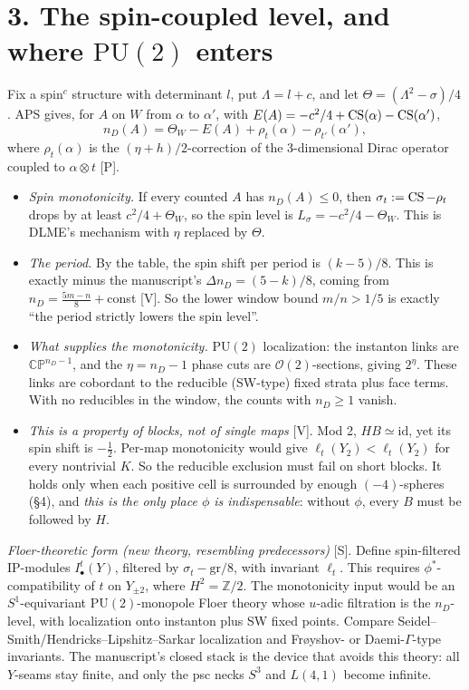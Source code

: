 \documentclass[10pt]{amsart}
\newcommand{\Z}{\mathbb Z}\newcommand{\Q}{\mathbb Q}\newcommand{\F}{\mathbb F}
\newcommand{\CP}{\mathbb{CP}}\newcommand{\CPb}{\overline{\mathbb{CP}}{}^2}
\newcommand{\V}{\textsf{[V]}}\newcommand{\Pl}{\textsf{[P]}}\newcommand{\Sp}{\textsf{[S]}}
\begin{document}
\section*{3. The spin-coupled level, and where $\mathrm{PU}(2)$ enters}
Fix a spin$^c$ structure with determinant $l$, put $\Lambda=l+c$, and let $\Theta=(\Lambda^2-\sigma)/4$. APS gives, for $A$ on $W$ from $\alpha$ to $\alpha'$, with $E(A)=-c^2/4+\operatorname{CS}(\alpha)-\operatorname{CS}(\alpha')$,
\[
n_D(A)=\Theta_W-E(A)+\rho_t(\alpha)-\rho_{t'}(\alpha'),
\]
where $\rho_t(\alpha)$ is the $(\eta+h)/2$-correction of the 3-dimensional Dirac operator coupled to $\alpha\otimes t$ \Pl.
\begin{itemize}
\item \emph{Spin monotonicity.} If every counted $A$ has $n_D(A)\le0$, then $\sigma_t:=\operatorname{CS}-\rho_t$ drops by at least $c^2/4+\Theta_W$, so the spin level is $L_\sigma=-c^2/4-\Theta_W$. This is DLME's mechanism with $\eta$ replaced by $\Theta$.
\item \emph{The period.} By the table, the spin shift per period is $(k-5)/8$. This is exactly minus the manuscript's $\Delta n_D=(5-k)/8$, coming from $n_D=\frac{5m-n}8+$const \V. So the lower window bound $m/n>1/5$ is exactly ``the period strictly lowers the spin level''.
\item \emph{What supplies the monotonicity.} $\mathrm{PU}(2)$ localization: the instanton links are $\CP^{n_D-1}$, and the $\eta=n_D-1$ phase cuts are $\mathcal O(2)$-sections, giving $2^\eta$. These links are cobordant to the reducible (SW-type) fixed strata plus face terms. With no reducibles in the window, the counts with $n_D\ge1$ vanish.
\item \emph{This is a property of blocks, not of single maps} \V. Mod 2, $HB\simeq\mathrm{id}$, yet its spin shift is $-\tfrac12$. Per-map monotonicity would give $\ell_t(Y_2)<\ell_t(Y_2)$ for every nontrivial $K$. So the reducible exclusion must fail on short blocks. It holds only when each positive cell is surrounded by enough $(-4)$-spheres (\S4), and \emph{this is the only place $\phi$ is indispensable}: without $\phi$, every $B$ must be followed by $H$.
\end{itemize}
\emph{Floer-theoretic form (new theory, resembling predecessors)} \Sp. Define spin-filtered IP-modules $I^{t}_\bullet(Y)$, filtered by $\sigma_t-\mathrm{gr}/8$, with invariant $\ell_t$. This requires $\phi^*$-compatibility of $t$ on $Y_{\pm2}$, where $H^2=\Z/2$. The monotonicity input would be an $S^1$-equivariant $\mathrm{PU}(2)$-monopole Floer theory whose $u$-adic filtration is the $n_D$-level, with localization onto instanton plus SW fixed points. Compare Seidel--Smith/Hendricks--Lipshitz--Sarkar localization and Frøyshov- or Daemi-$\Gamma$-type invariants. The manuscript's closed stack is the device that avoids this theory: all $Y$-seams stay finite, and only the psc necks $S^3$ and $L(4,1)$ become infinite.
\end{document}
